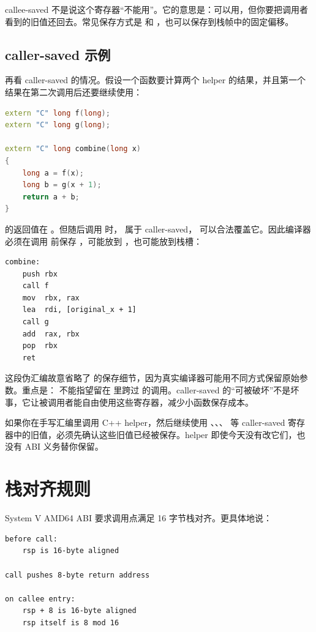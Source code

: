 \begin{deepdive}
callee-saved 不是说这个寄存器“不能用”。它的意思是：可以用，但你要把调用者看到的旧值还回去。常见保存方式是  和 ，也可以保存到栈帧中的固定偏移。
\end{deepdive}

\subsection{caller-saved 示例}

再看 caller-saved 的情况。假设一个函数要计算两个 helper 的结果，并且第一个结果在第二次调用后还要继续使用：

\begin{lstlisting}[language=C++]
extern "C" long f(long);
extern "C" long g(long);

extern "C" long combine(long x)
{
    long a = f(x);
    long b = g(x + 1);
    return a + b;
}
\end{lstlisting}

 的返回值在 。但随后调用  时， 属于 caller-saved， 可以合法覆盖它。因此编译器必须在调用  前保存 ，可能放到 ，也可能放到栈槽：

\begin{lstlisting}
combine:
    push rbx
    call f
    mov  rbx, rax
    lea  rdi, [original_x + 1]
    call g
    add  rax, rbx
    pop  rbx
    ret
\end{lstlisting}

这段伪汇编故意省略了  的保存细节，因为真实编译器可能用不同方式保留原始参数。重点是： 不能指望留在  里跨过  的调用。caller-saved 的“可被破坏”不是坏事，它让被调用者能自由使用这些寄存器，减少小函数保存成本。

\begin{warningbox}
如果你在手写汇编里调用 C++ helper，然后继续使用 、、、 等 caller-saved 寄存器中的旧值，必须先确认这些旧值已经被保存。helper 即使今天没有改它们，也没有 ABI 义务替你保留。
\end{warningbox}

\section{栈对齐规则}

System V AMD64 ABI 要求调用点满足 16 字节栈对齐。更具体地说：

\begin{lstlisting}
before call:
    rsp is 16-byte aligned

call pushes 8-byte return address

on callee entry:
    rsp + 8 is 16-byte aligned
    rsp itself is 8 mod 16
\end{lstlisting}

